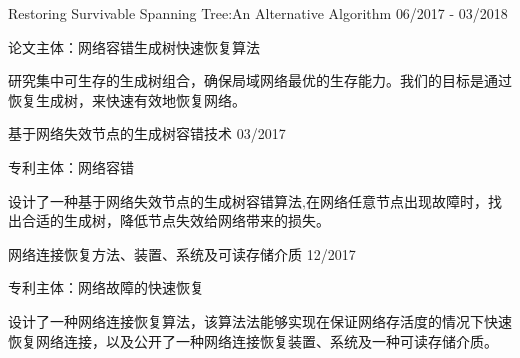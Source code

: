 \vspace{-3.0mm}

\begin{cventries}
\vspace{-0.7mm}

\cvexperience
{ Restoring Survivable Spanning Tree:An Alternative Algorithm}
{06/2017 - 03/2018}
{
    \begin{cvitems}
    \item {论文主体：网络容错生成树快速恢复算法}
    \item {研究集中可生存的生成树组合，确保局域网络最优的生存能力。我们的目标是通过恢复生成树，来快速有效地恢复网络。}
    \end{cvitems}
}

\cvexperience
{ 基于网络失效节点的生成树容错技术}
{03/2017}
{
    \begin{cvitems}
    \item {专利主体：网络容错}
    \item {设计了一种基于网络失效节点的生成树容错算法,在网络任意节点出现故障时，找出合适的生成树，降低节点失效给网络带来的损失。}
    \end{cvitems}
}

\cvexperience
{ 网络连接恢复方法、装置、系统及可读存储介质 }
{12/2017}
{
    \begin{cvitems}
    \item {专利主体：网络故障的快速恢复}
    \item {设计了一种网络连接恢复算法，该算法法能够实现在保证网络存活度的情况下快速恢复网络连接，以及公开了一种网络连接恢复装置、系统及一种可读存储介质。
}
    \end{cvitems}
}

\end{cventries}